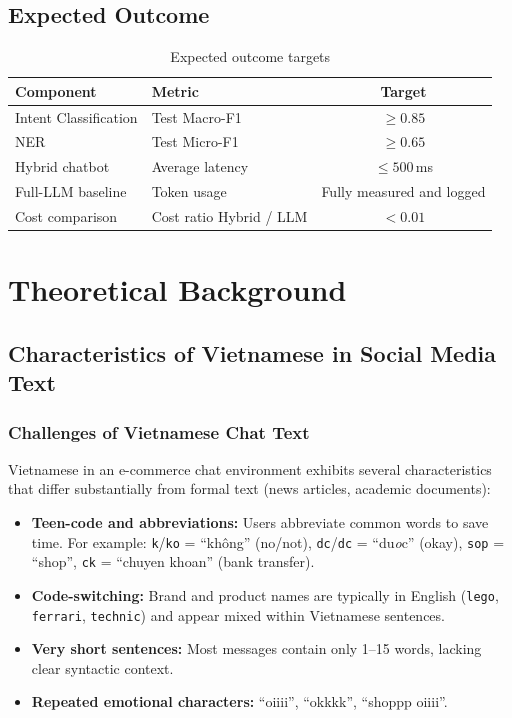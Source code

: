 \documentclass[12pt, a4paper]{report}
\begin{document}
\section{Expected Outcome}

\begin{table}[H]
\centering
\caption{Expected outcome targets}
\label{tab:expected_outcome}
\begin{tabular}{llc}
\toprule
\textbf{Component} & \textbf{Metric} & \textbf{Target} \\
\midrule
Intent Classification & Test Macro-F1           & $\geq 0.85$ \\
NER                   & Test Micro-F1           & $\geq 0.65$ \\
Hybrid chatbot        & Average latency         & $\leq 500$\,ms \\
Full-LLM baseline     & Token usage             & Fully measured and logged \\
Cost comparison       & Cost ratio Hybrid / LLM & $< 0.01$ \\
\bottomrule
\end{tabular}
\end{table}

\chapter{Theoretical Background}

\section{Characteristics of Vietnamese in Social Media Text}

\subsection{Challenges of Vietnamese Chat Text}

Vietnamese in an e-commerce chat environment exhibits several characteristics
that differ substantially from formal text (news articles, academic documents):

\begin{itemize}
  \item \textbf{Teen-code and abbreviations:} Users abbreviate common words
        to save time. For example: \texttt{k}/\texttt{ko} = ``kh\^ong'' (no/not),
        \texttt{dc}/\texttt{dc} = ``du\textit{o}c'' (okay),
        \texttt{sop} = ``shop'', \texttt{ck} = ``chuyen khoan'' (bank transfer).
  \item \textbf{Code-switching:} Brand and product names are typically in English
        (\texttt{lego}, \texttt{ferrari}, \texttt{technic})
        and appear mixed within Vietnamese sentences.
  \item \textbf{Very short sentences:} Most messages contain only 1--15 words,
        lacking clear syntactic context.
  \item \textbf{Repeated emotional characters:} ``oiiii'', ``okkkk'', ``shoppp oiiii''.
\end{itemize}
\end{document}
